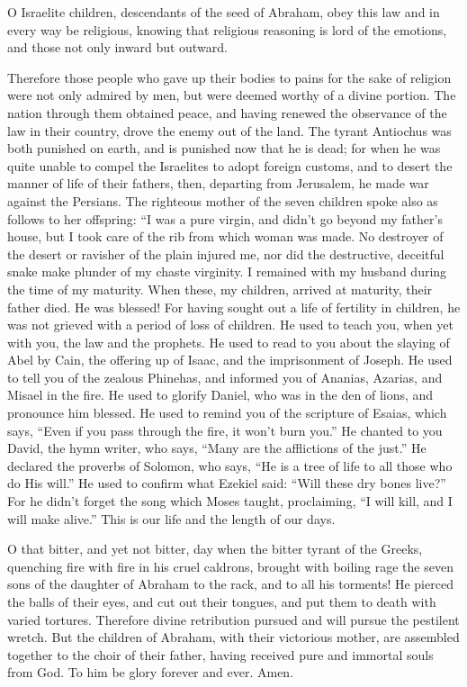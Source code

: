  O Israelite children, descendants of the seed of Abraham,
obey this law and in every way be religious,  knowing that
religious reasoning is lord of the emotions, and those not only inward
but outward.

 Therefore those people who gave up their bodies to pains
for the sake of religion were not only admired by men, but were deemed
worthy of a divine portion.  The nation through them
obtained peace, and having renewed the observance of the law in their
country, drove the enemy out of the land.  The tyrant
Antiochus was both punished on earth, and is punished now that he is
dead; for when he was quite unable to compel the Israelites to adopt
foreign customs, and to desert the manner of life of their fathers,
 then, departing from Jerusalem, he made war against the
Persians.  The righteous mother of the seven children
spoke also as follows to her offspring: ``I was a pure virgin, and
didn't go beyond my father's house, but I took care of the rib from
which woman was made.  No destroyer of the desert or
ravisher of the plain injured me, nor did the destructive, deceitful
snake make plunder of my chaste virginity. I remained with my husband
during the time of my maturity.  When these, my children,
arrived at maturity, their father died. He was blessed! For having
sought out a life of fertility in children, he was not grieved with a
period of loss of children.  He used to teach you, when
yet with you, the law and the prophets.  He used to read
to you about the slaying of Abel by Cain, the offering up of Isaac, and
the imprisonment of Joseph.  He used to tell you of the
zealous Phinehas, and informed you of Ananias, Azarias, and Misael in
the fire.  He used to glorify Daniel, who was in the den
of lions, and pronounce him blessed.  He used to remind
you of the scripture of Esaias, which says, ``Even if you pass through
the fire, it won't burn you.''  He chanted to you David,
the hymn writer, who says, ``Many are the afflictions of the just.''
 He declared the proverbs of Solomon, who says, ``He is a
tree of life to all those who do His will.''  He used to
confirm what Ezekiel said: ``Will these dry bones live?''
 For he didn't forget the song which Moses taught,
proclaiming, ``I will kill, and I will make alive.'' 
This is our life and the length of our days.

 O that bitter, and yet not bitter, day when the bitter
tyrant of the Greeks, quenching fire with fire in his cruel caldrons,
brought with boiling rage the seven sons of the daughter of Abraham to
the rack, and to all his torments!  He pierced the balls
of their eyes, and cut out their tongues, and put them to death with
varied tortures.  Therefore divine retribution pursued
and will pursue the pestilent wretch.  But the children
of Abraham, with their victorious mother, are assembled together to the
choir of their father, having received pure and immortal souls from God.
 To him be glory forever and ever. Amen.
